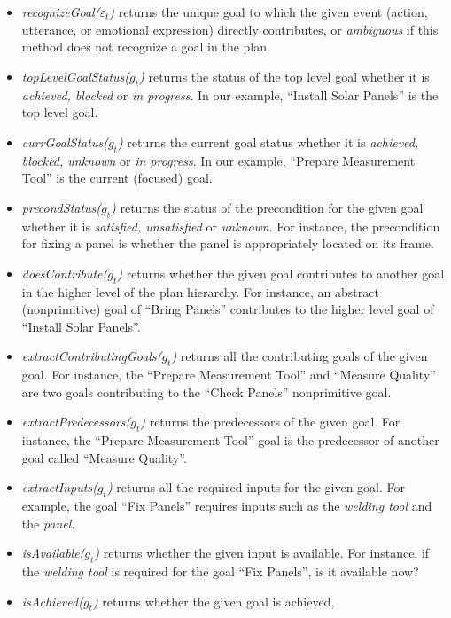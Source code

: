 \documentclass{aamas2016}
\begin{document}
\begin{itemize}
  \item \textit{recognizeGoal($\varepsilon_t$)} returns the unique goal to which
  the given event (action, utterance, or emotional expression) directly
  contributes, or \textit{ambiguous} if this method does not recognize a goal in
  the plan.
  \item \textit{topLevelGoalStatus($g_t$)} returns the status of the top level
  goal whether it is \textit{achieved, blocked} or \textit{in progress}. In
  our example, ``Install Solar Panels'' is the top level goal.
  \item \textit{currGoalStatus($g_t$)} returns the current goal status whe\-ther
  it is \textit{achieved, blocked, unknown} or \textit{in progress}. In our
  example, ``Prepare Measurement Tool'' is the current (focused) goal.
  \item \textit{precondStatus($g_t$)} returns the status of the precondition for
  the given goal whether it is \textit{satisfied, unsatisfied} or
  \textit{unknown}. For instance, the precondition for fixing a panel is whether
  the panel is appropriately located on its frame.
  \item \textit{doesContribute($g_t$)} returns whether the given goal
  contributes to another goal in the higher level of the plan hierarchy. For
  instance, an abstract (nonprimitive) goal of ``Bring Panels'' contributes to
  the higher level goal of ``Install Solar Panels''.
  \item \textit{extractContributingGoals($g_t$)} returns all the contributing
  goals of the given goal. For instance, the ``Prepare Measurement Tool'' and
  ``Measure Quality'' are two goals contributing to the ``Check Panels''
  nonprimitive goal.
  \item \textit{extractPredecessors($g_t$)} returns the predecessors of the
  given goal. For instance, the ``Prepare Measurement Tool'' goal is the
  predecessor of another goal called ``Measure Quality''.
  \item \textit{extractInputs($g_t$)} returns all the required inputs for
  the given goal. For example, the goal ``Fix Panels'' requires inputs such as
  the \textit{welding tool} and the \textit{panel}.
  \item \textit{isAvailable($g_t$)} returns whether the given input is
  available. For instance, if the \textit{welding tool} is required for the goal
  ``Fix Panels'', is it available now?
  \item \textit{isAchieved($g_t$)} returns whether the given goal is achieved,

\end{itemize}
\end{document}
